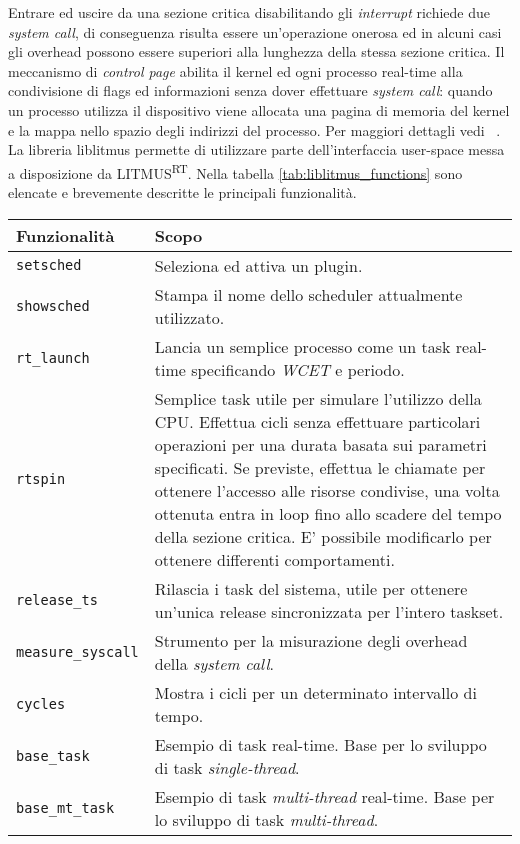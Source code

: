 \begin{appendices}
Entrare ed uscire da una sezione critica disabilitando gli \textit{interrupt} richiede due \textit{system call}, di conseguenza risulta essere un'operazione onerosa ed in alcuni casi gli overhead possono essere superiori alla lunghezza della stessa sezione critica. Il meccanismo di \textit{control page} abilita il kernel ed ogni processo real-time alla condivisione di flags ed informazioni senza dover effettuare \textit{system call}: quando un processo utilizza il dispositivo viene allocata una pagina di memoria del kernel e la mappa nello spazio degli indirizzi del processo. Per maggiori dettagli vedi ~\cite{BBBThesis}.\\

La libreria liblitmus permette di utilizzare parte dell'interfaccia user-space messa a disposizione da LITMUS\textsuperscript{RT}. Nella tabella \ref{tab:liblitmus_functions} sono elencate e brevemente descritte le principali funzionalità.\\

\begin{table}
  \centering
  \begin{tabular}{|l p{10cm}|}
	\hline
	    Funzionalità & Scopo \\
	\hline \hline
	   
\texttt{setsched}			& Seleziona ed attiva un plugin. \\
\texttt{showsched}			& Stampa il nome dello scheduler attualmente utilizzato. \\
\texttt{rt\_launch}			& Lancia un semplice processo come un task real-time specificando \textit{WCET} e periodo. \\
\texttt{rtspin}				& Semplice task utile per simulare l'utilizzo della CPU. Effettua cicli senza effettuare particolari operazioni per una durata basata sui parametri specificati. Se previste, effettua le chiamate per ottenere l'accesso alle risorse condivise, una volta ottenuta entra in loop fino allo scadere del tempo della sezione critica. E' possibile modificarlo per ottenere differenti comportamenti. \\
\texttt{release\_ts}		& Rilascia i task del sistema, utile per ottenere un'unica release sincronizzata per l'intero taskset.\\
\texttt{measure\_syscall}	& Strumento per la misurazione degli overhead della \textit{system call}.\\
\texttt{cycles}				& Mostra i cicli per un determinato intervallo di tempo. \\
\texttt{base\_task}			& Esempio di task real-time. Base per lo sviluppo di task \textit{single-thread}. \\
\texttt{base\_mt\_task}		& Esempio di task \textit{multi-thread} real-time. Base per lo sviluppo di task \textit{multi-thread}. \\


\end{tabular}
\end{table}
\end{appendices}
